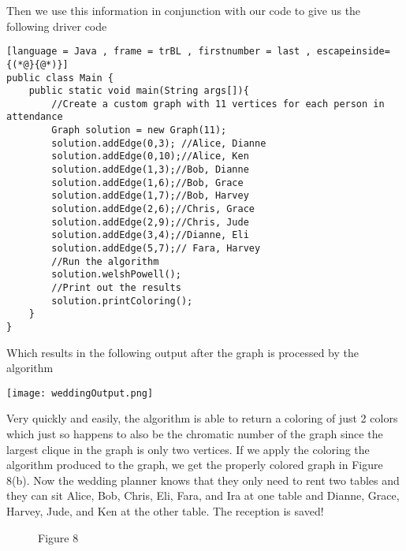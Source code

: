 \documentclass[12pt, letterpaper]{article}
\begin{document}
Then we use this information in conjunction with our code to give us the following driver code


\begin{lstlisting}[language = Java , frame = trBL , firstnumber = last , escapeinside={(*@}{@*)}]
public class Main {
    public static void main(String args[]){
        //Create a custom graph with 11 vertices for each person in attendance
        Graph solution = new Graph(11);
        solution.addEdge(0,3); //Alice, Dianne
        solution.addEdge(0,10);//Alice, Ken
        solution.addEdge(1,3);//Bob, Dianne
        solution.addEdge(1,6);//Bob, Grace
        solution.addEdge(1,7);//Bob, Harvey
        solution.addEdge(2,6);//Chris, Grace
        solution.addEdge(2,9);//Chris, Jude
        solution.addEdge(3,4);//Dianne, Eli
        solution.addEdge(5,7);// Fara, Harvey
        //Run the algorithm
        solution.welshPowell();
        //Print out the results
        solution.printColoring();
    }
}
\end{lstlisting}


Which results in the following output after the graph is processed by the algorithm


\begin{center}
\texttt{[image: weddingOutput.png]}
\end{center}


Very quickly and easily, the algorithm is able to return a coloring of just 2 colors which just so happens to also be the chromatic number of the graph since the largest clique in the graph is only two vertices. If we apply the coloring the algorithm produced to the graph, we get the properly colored graph in Figure 8(b). Now the wedding planner knows that they only need to rent two tables and they can sit Alice, Bob, Chris, Eli, Fara, and Ira at one table and Dianne, Grace, Harvey, Jude, and Ken at the other table. The reception is saved!


\begin{figure}[H]%
\begin{center}
	\qquad
{}%
	\caption*{Figure 8}
\end{center}
\end{figure}
\end{document}
